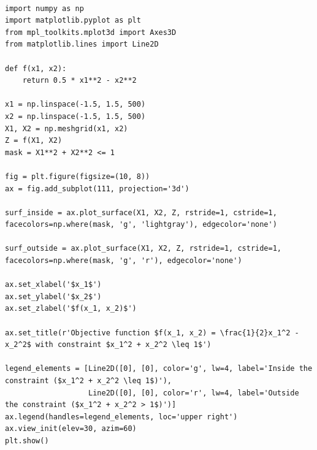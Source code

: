 \documentclass{article}
\begin{document}
\begin{lstlisting}

import numpy as np
import matplotlib.pyplot as plt
from mpl_toolkits.mplot3d import Axes3D
from matplotlib.lines import Line2D

def f(x1, x2):
    return 0.5 * x1**2 - x2**2

x1 = np.linspace(-1.5, 1.5, 500)
x2 = np.linspace(-1.5, 1.5, 500)
X1, X2 = np.meshgrid(x1, x2)
Z = f(X1, X2)
mask = X1**2 + X2**2 <= 1

fig = plt.figure(figsize=(10, 8))
ax = fig.add_subplot(111, projection='3d')

surf_inside = ax.plot_surface(X1, X2, Z, rstride=1, cstride=1, facecolors=np.where(mask, 'g', 'lightgray'), edgecolor='none')

surf_outside = ax.plot_surface(X1, X2, Z, rstride=1, cstride=1, facecolors=np.where(mask, 'g', 'r'), edgecolor='none')

ax.set_xlabel('$x_1$')
ax.set_ylabel('$x_2$')
ax.set_zlabel('$f(x_1, x_2)$')

ax.set_title(r'Objective function $f(x_1, x_2) = \frac{1}{2}x_1^2 - x_2^2$ with constraint $x_1^2 + x_2^2 \leq 1$')

legend_elements = [Line2D([0], [0], color='g', lw=4, label='Inside the constraint ($x_1^2 + x_2^2 \leq 1$)'),
                   Line2D([0], [0], color='r', lw=4, label='Outside the constraint ($x_1^2 + x_2^2 > 1$)')]
ax.legend(handles=legend_elements, loc='upper right')
ax.view_init(elev=30, azim=60)  
plt.show()

\end{lstlisting}
\end{document}
